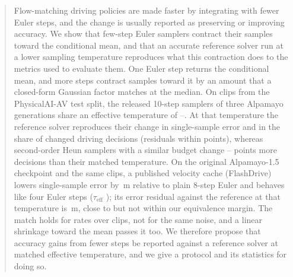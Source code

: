 \documentclass{article}
\theoremstyle{plain}
\theoremstyle{definition}
\theoremstyle{remark}
\newcommand{\taueff}{\tau_{\mathrm{eff}}}
\begin{document}

\printAffiliationsAndNotice{}

\begin{abstract}
Flow-matching driving policies are made faster by integrating with fewer Euler steps, and the change is usually reported as preserving or improving accuracy. We show that few-step Euler samplers contract their samples toward the conditional mean, and that an accurate reference solver run at a lower sampling temperature reproduces what this contraction does to the metrics used to evaluate them. One Euler step returns the conditional mean, and more steps contract samples toward it by an amount that a closed-form Gaussian factor matches at the median. On \NClips{} clips from the PhysicalAI-AV test split, the released 10-step samplers of three Alpamayo generations share an effective temperature of \AOneFiveETenTau--\ROneETenTau. At that temperature the reference solver reproduces their change in single-sample error and in the share of changed driving decisions (residuals within \FlipResidMaxAbs{} points), whereas second-order Heun samplers with a similar budget change \AOneFiveHeunFiveFlipResid--\AOneFiveHeunThreeFlipResid{} points more decisions than their matched temperature. On the original Alpamayo-1.5 checkpoint and the same clips, a published velocity cache (FlashDrive) lowers single-sample error by \FDGainEEight\,m relative to plain 8-step Euler and behaves like four Euler steps ($\taueff$ \FDTau); its error residual against the reference at that temperature is \FDResidPt\,m, close to but not within our equivalence margin. The match holds for rates over clips, not for the same noise, and a linear shrinkage toward the mean passes it too. We therefore propose that accuracy gains from fewer steps be reported against a reference solver at matched effective temperature, and we give a protocol and its statistics for doing so.
\end{abstract}
\end{document}
